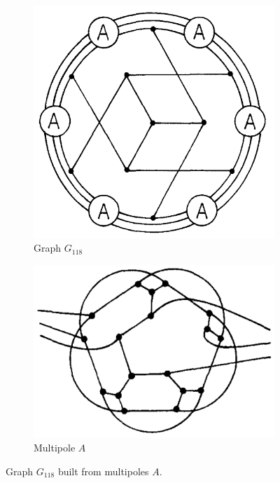 \documentclass[12pt, twoside]{book}
\begin{document}
\begin{example}
	\begin{figure}
		\centering
		\begin{subfigure}[b]{0.45\textwidth}
			\centering
			\includegraphics[width=\textwidth]{images/Kochol-final-graph}
			\caption{Graph $G_{118}$}
			\label{fig:Kochol-final-graph-G118}
		\end{subfigure}
		\hfill
		\begin{subfigure}[b]{0.45\textwidth}
			\centering
			\includegraphics[width=\textwidth]{images/Kochol-multipole-A}
			\caption{Multipole $A$}
			\label{fig:Kochol-multipole-A}
		\end{subfigure}
		\caption{\cite{Kochol1996} Graph $G_{118}$ built from multipoles $A$.}
	\end{figure}
	

\end{example}
\end{document}
